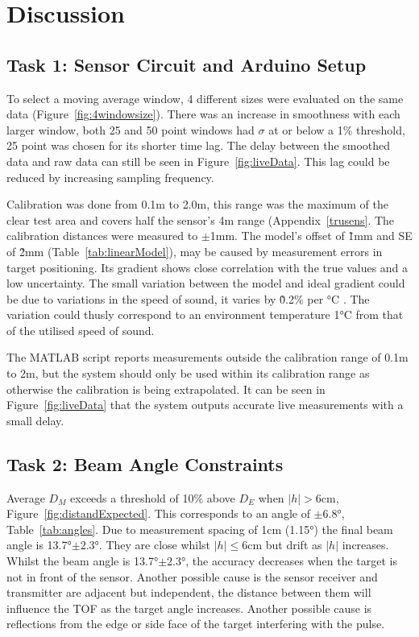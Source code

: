 \documentclass[a4paper,12pt]{article}
\begin{document}
\break


\section{Discussion}

\subsection{Task 1: Sensor Circuit and Arduino Setup}
To select a moving average window, 4 different sizes were evaluated on the same data (Figure~\ref{fig:4windowsize}). There was an increase in smoothness with each larger window, both 25 and 50 point windows had $\sigma$ at or below a 1\% threshold, 25 point was chosen for its shorter time lag. The delay between the smoothed data and raw data can still be seen in Figure~\ref{fig:liveData}. This lag could be reduced by increasing sampling frequency.

Calibration was done from 0.1m to 2.0m, this range was the maximum of the clear test area and covers half the sensor's 4m range (Appendix~\ref{trusens}. The calibration distances were measured to $\pm$1mm. The model's offset of \~1mm and SE of \~2mm (Table~\ref{tab:linearModel}), may be caused by measurement errors in target positioning. Its gradient shows close correlation with the true values and a low uncertainty. The small variation between the model and ideal gradient could be due to variations in the speed of sound, it varies by \~0.2\% per °C \parencite{10.1121/1.391918}. The variation could thusly correspond to an environment temperature 1°C from that of the utilised speed of sound.

The MATLAB script reports measurements outside the calibration range of 0.1m to 2m, but the system should only be used within its calibration range as otherwise the calibration is being extrapolated.
It can be seen in Figure~\ref{fig:liveData} that the system outputs accurate live measurements with a small delay.

\subsection{Task 2: Beam Angle Constraints}

 Average $D_{M}$ exceeds a threshold of 10\% above $D_{E}$ when $|h|>6$cm, Figure~\ref{fig:distandExpected}. This corresponds to an angle of $\pm$6.8°, Table~\ref{tab:angles}. Due to measurement spacing of 1cm (1.15°) the final beam angle is 13.7°$\pm$2.3°. They are close whilst $|h|\leq6$cm but drift as $|h|$ increases. Whilst the beam angle is 13.7°$\pm$2.3°, the accuracy decreases when the target is not in front of the sensor. Another possible cause is the sensor receiver and transmitter are adjacent but independent, the distance between them will influence the TOF as the target angle increases. Another possible cause is reflections from the edge or side face of the target interfering with the pulse.
\end{document}
